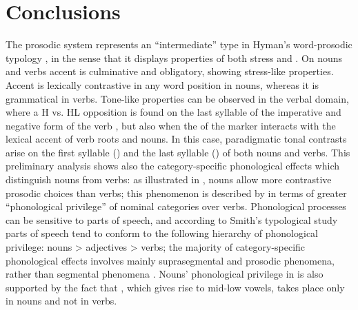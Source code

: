 \documentclass[output=paper,modfonts,nonflat,hidelinks]{langsci/langscibook}
\begin{document}
\section{Conclusions} \label{sec:Petrollino:4}
The  prosodic system represents an “intermediate” type in Hyman's word-prosodic typology \citep{Hyman2006,Hyman2009}, in the sense that it displays properties of both stress and . On nouns and verbs accent is culminative and obligatory, showing stress-like properties. Accent is lexically contrastive in any word position in nouns, whereas it is grammatical in verbs. Tone-like properties can be observed in the verbal domain, where a H vs. HL opposition is found on the last syllable of the imperative and negative form of the verb , but also when the  of the   marker interacts with the lexical accent of verb roots and nouns. In this case, paradigmatic tonal contrasts arise on the first syllable () and the last syllable () of both nouns and verbs.
This preliminary analysis shows also the category-specific phonological effects which distinguish  nouns from verbs: as illustrated in ,  nouns allow more contrastive prosodic choices than verbs; this phenomenon is described by \citet{Smith2011} in terms of greater “phonological privilege” of nominal categories over verbs. Phonological processes can be sensitive to parts of speech, and according to Smith's typological study parts of speech tend to conform to the following hierarchy of phonological privilege: nouns > adjectives > verbs; the majority of category-specific phonological effects involves mainly suprasegmental and prosodic phenomena, rather than segmental phenomena \citep[2448]{Smith2011}. Nouns' phonological privilege in  is also supported by the fact that , which gives rise to mid-low vowels, takes place only in nouns and not in verbs.
\end{document}
